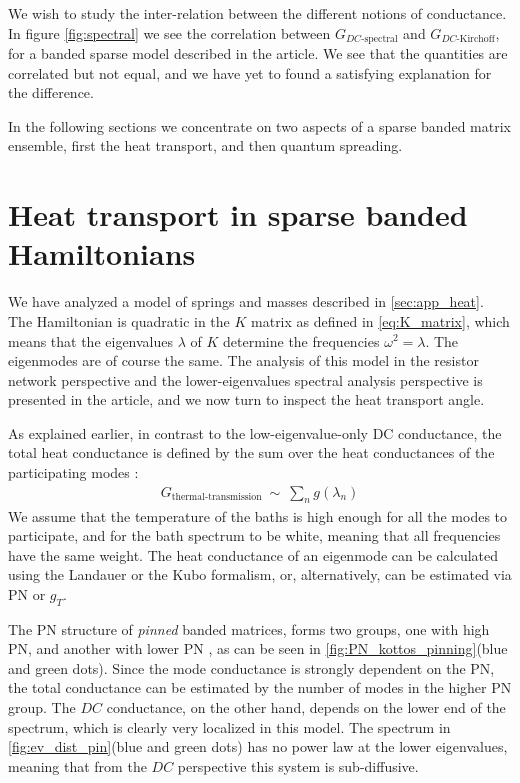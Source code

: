 We wish to study the inter-relation between the different notions of conductance. 
%
In figure \autoref{fig:spectral} we see the correlation 
between $G_{DC\textrm{-spectral}}$ and $G_{DC\textrm{-Kirchoff}}$, for a banded
sparse model described in the article. We see that the quantities are
correlated but not equal, and we have yet to found a satisfying explanation for the difference.

 In the
following sections we concentrate on two aspects of a sparse banded matrix ensemble,
first the heat transport, and then quantum spreading.

\section{Heat transport in sparse banded Hamiltonians}\label{sec:PTA}


We have analyzed a model of springs and masses described in \autoref{sec:app_heat}.
The Hamiltonian is quadratic in the $K$ matrix as defined in \autoref{eq:K_matrix},
which means that the eigenvalues $\lambda$ of $K$ determine the frequencies $\omega^2 = \lambda$.
The eigenmodes are of course the same. The analysis of this model in the resistor network perspective
and the lower-eigenvalues spectral analysis perspective is presented in the article, and we now
turn to inspect the heat transport angle.


As explained earlier, in contrast to the low-eigenvalue-only DC conductance, 
the total heat conductance is defined by the
sum over the heat conductances of the participating modes \cite{dhar_heat_2001,lepri_thermal_2003}:
%
\begin{align}
G_{\textrm{thermal-transmission}} \ \sim\ \sum_n g(\lambda_n)
\end{align}
%
We assume that the temperature of the baths is high enough for all the modes to
participate, and for the bath spectrum to be white, meaning that all frequencies
have the same weight. The heat conductance of an eigenmode can be calculated
using the Landauer or the Kubo formalism, or, alternatively, can be estimated
via PN or $g_T$.


The PN structure of \emph{pinned}\cite{roy_role_2008} banded matrices,
forms two groups, one with high PN, and another with lower PN \cite{bodyfelt_unpub},
as can be seen in \autoref{fig:PN_kottos_pinning}(blue and green dots). Since the mode conductance 
is strongly dependent on the PN, the total conductance can be estimated
by the number of modes in the higher PN group. The $DC$ conductance, on the
other hand, depends on the lower end of the spectrum, which is clearly very localized
in this model. The spectrum in \autoref{fig:ev_dist_pin}(blue and green dots) has no power law
at the lower eigenvalues, meaning that from the $DC$ perspective this system is sub-diffusive.



